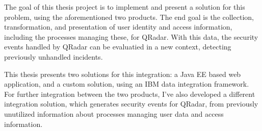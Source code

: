 The goal of this thesis project is to implement and present a solution for this problem, using the aforementioned two products. The end goal is the collection, transformation, and presentation of user identity and access information, including the processes managing these, for QRadar. With this data, the security events handled by QRadar can be evaluatied in a new context, detecting previously unhandled incidents.

This thesis presents two solutions for this integration: a Java EE based web application, and a custom solution, using an IBM data integration framework. For further integration between the two products, I've also developed a different integration solution, which generates security events for QRadar, from previously unutilized information about processes managing user data and access information.


\vfill
\selectthesislanguage

\setcounter{romanPage}{\value{page}}
